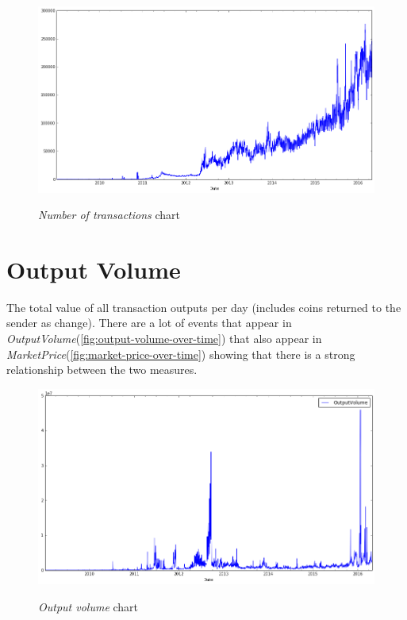 \begin{figure}[bth]
  \myfloatalign
  {\includegraphics[width=1\linewidth]
    {gfx/n-transactions-over-time}}
  \caption{\textit{Number of transactions} chart}
  \label{fig:n-transactions-over-time}
\end{figure}


\section{Output Volume}
\label{sec:output-volume}

The total value of all transaction outputs per day (includes coins
returned to the sender as change). There are a lot of events that
appear in \textit{OutputVolume}(\autoref{fig:output-volume-over-time})
that also appear in
\textit{MarketPrice}(\autoref{fig:market-price-over-time}) showing
that there is a strong relationship between the two measures.

\begin{figure}[bth]
  \myfloatalign
  {\includegraphics[width=1\linewidth]
    {gfx/output-volume-over-time}}
  \caption{\textit{Output volume} chart}
  \label{fig:output-volume-over-time}
\end{figure}

